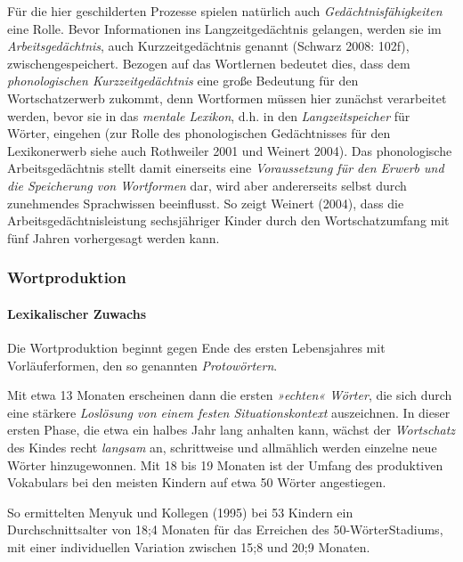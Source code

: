 \documentclass[
  letterpaper,
]{scrbook}
\let\oldparagraph\paragraph
\renewcommand{\paragraph}[1]{\oldparagraph{#1}\mbox{}}
\begin{document}
Für die hier geschilderten Prozesse spielen natürlich auch
\emph{Gedächtnisfähigkeiten} eine Rolle. Bevor Informationen ins
Langzeitgedächtnis gelangen, werden sie im \emph{Arbeitsgedächtnis},
auch Kurzzeitgedächtnis genannt (Schwarz 2008: 102f),
zwischengespeichert. Bezogen auf das Wortlernen bedeutet dies, dass dem
\emph{phonologischen Kurzzeitgedächtnis} eine große Bedeutung für den
Wortschatzerwerb zukommt, denn Wortformen müssen hier zunächst
verarbeitet werden, bevor sie in das \emph{mentale Lexikon}, d.h. in den
\emph{Langzeitspeicher} für Wörter, eingehen (zur Rolle des
phonologischen Gedächtnisses für den Lexikonerwerb siehe auch Rothweiler
2001 und Weinert 2004). Das phonologische Arbeitsgedächtnis stellt damit
einerseits eine \emph{Voraussetzung für den Erwerb und die Speicherung
von Wortformen} dar, wird aber andererseits selbst durch zunehmendes
Sprachwissen beeinflusst. So zeigt Weinert (2004), dass die
Arbeitsgedächtnisleistung sechsjähriger Kinder durch den
Wortschatzumfang mit fünf Jahren vorhergesagt werden kann.

\hypertarget{wortproduktion}{%
\subsubsection{Wortproduktion}\label{wortproduktion}}

\hypertarget{lexikalischer-zuwachs}{%
\paragraph{Lexikalischer Zuwachs}\label{lexikalischer-zuwachs}}

Die Wortproduktion beginnt gegen Ende des ersten Lebensjahres mit
Vorläuferformen, den so genannten \emph{Protowörtern}.

Mit etwa 13 Monaten erscheinen dann die ersten \emph{»echten« Wörter},
die sich durch eine stärkere \emph{Loslösung von einem festen
Situationskontext} auszeichnen. In dieser ersten Phase, die etwa ein
halbes Jahr lang anhalten kann, wächst der \emph{Wortschatz} des Kindes
recht \emph{langsam} an, schrittweise und allmählich werden einzelne
neue Wörter hinzugewonnen. Mit 18 bis 19 Monaten ist der Umfang des
produktiven Vokabulars bei den meisten Kindern auf etwa 50 Wörter
angestiegen.

\begin{tcolorbox}[enhanced jigsaw, breakable, colframe=quarto-callout-note-color-frame, bottomrule=.15mm, left=2mm, opacityback=0, colback=white, rightrule=.15mm, toprule=.15mm, leftrule=.75mm, arc=.35mm]
\begin{minipage}[t]{5.5mm}
\textcolor{quarto-callout-note-color}{\faInfo}
\end{minipage}%
\begin{minipage}[t]{\textwidth - 5.5mm}

So ermittelten Menyuk und Kollegen (1995) bei 53 Kindern ein
Durchschnittsalter von 18;4 Monaten für das Erreichen des
50-WörterStadiums, mit einer individuellen Variation zwischen 15;8 und
20;9 Monaten.

\end{minipage}%
\end{tcolorbox}
\end{document}
